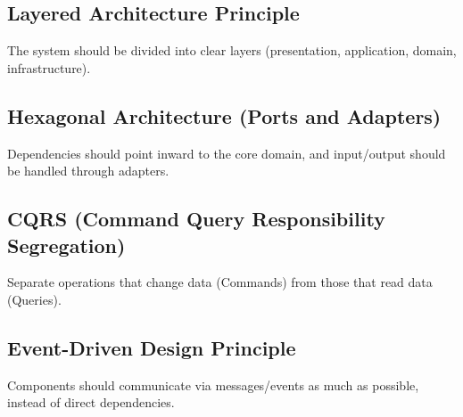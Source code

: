     \subsection{Layered Architecture Principle}
        The system should be divided into clear layers (presentation, application, domain, infrastructure).
    
    \subsection{Hexagonal Architecture (Ports and Adapters)}
        Dependencies should point inward to the core domain, and input/output should be handled through adapters.
    
    \subsection{CQRS (Command Query Responsibility Segregation)}
        Separate operations that change data (Commands) from those that read data (Queries).
    
    \subsection{Event-Driven Design Principle}
        Components should communicate via messages/events as much as possible, instead of direct dependencies.
